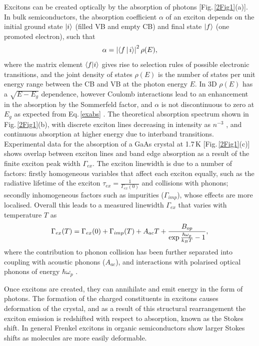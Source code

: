 Excitons can be created optically by the absorption of photons [Fig.\,\ref{2Fig1}(a)]. In bulk semiconductors, the absorption coefficient $\alpha$ of an exciton depends on the initial ground state $\ket{i}$ (filled VB and empty CB) and final state $\ket{f}$ (one promoted electron), such that
\begin{equation}
\centering
\alpha = \left| \Braket{f | i} \right|^2 \rho(E) ,
\label{exabs}
\end{equation}
where the matrix element $\braket{f | i}$ gives rise to selection rules of possible electronic transitions, and the joint density of states $\rho(E)$ is the number of states per unit energy range between the CB and VB at the photon energy $E$. In 3D $\rho(E)$ has a $\sqrt{E-E_g}$ dependence, however Coulomb interactions lead to an enhancement in the absorption by the Sommerfeld factor, and $\alpha$ is not discontinuous to zero at $E_g$ as expected from Eq.\,\ref{exabs} \cite{Bassu1997}. The theoretical absorption spectrum shown in Fig.\,\ref{2Fig1}(b), with discrete exciton lines decreasing in intensity as $n^{-3}$ \cite{Bassu1997}, and continuous absorption at higher energy due to interband transitions. Experimental data for the absorption of a GaAs crystal at 1.7\,K [Fig.\,\ref{2Fig1}(c)] shows overlap between exciton lines and band edge absorption as a result of the finite exciton peak width $\Gamma_{ex}$. The exciton linewidth is due to a number of factors: firstly homogeneous variables that affect each exciton equally, such as the radiative lifetime of the exciton $\tau_{ex} = \frac{1}{\Gamma_{ex}(0)}$ and collisions with phonons; secondly inhomogeneous factors such as impurities ($\Gamma_{imp}$), whose effects are more localised. Overall this leads to a measured linewidth $\Gamma_{ex}$ that varies with temperature $T$ as
\begin{equation}
\centering
\Gamma_{ex}(T) = \Gamma_{ex}(0) +  \Gamma_{imp}(T) +A_{ac}T + \frac{B_{op}}{\exp{\frac{\hbar\omega_p}{k_B T}}-1},
\label{exwidth}
\end{equation}
where the contribution to phonon collision has been further separated into coupling with acoustic phonons ($A_{ac}$), and interactions with polarised optical phonons of energy $\hbar\omega_p$ \cite{Dammak2009}. 

Once excitons are created, they can annihilate and emit energy in the form of photons. The formation of the charged constituents in excitons causes deformation of the crystal, and as a result of this structural rearrangement the exciton emission is redshifted with respect to absorption, known as the Stokes shift. In general Frenkel excitons in organic semiconductors show larger Stokes shifts as molecules are more easily deformable.

